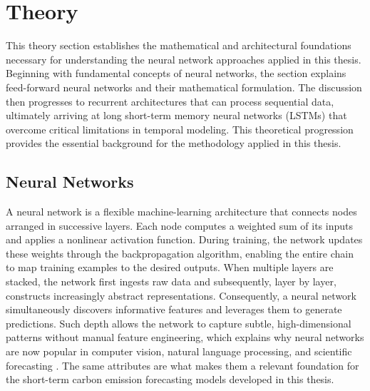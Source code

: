 \thispagestyle{plain}
\section{Theory}
\label{sec:theory}

This theory section establishes the mathematical and architectural foundations necessary for understanding the neural network approaches applied in this thesis. Beginning with fundamental concepts of neural networks, the section explains feed-forward neural networks and their mathematical formulation. The discussion then progresses to recurrent architectures that can process sequential data, ultimately arriving at long short-term memory neural networks (LSTMs) that overcome critical limitations in temporal modeling. This theoretical progression provides the essential background for the methodology applied in this thesis.

\subsection{Neural Networks}

A neural network is a flexible machine-learning architecture that connects nodes arranged in successive layers. Each node computes a weighted sum of its inputs and applies a nonlinear activation function. During training, the network updates these weights through the backpropagation algorithm, enabling the entire chain to map training examples to the desired outputs. When multiple layers are stacked, the network first ingests raw data and subsequently, layer by layer, constructs increasingly abstract representations. Consequently, a neural network simultaneously discovers informative features and leverages them to generate predictions. Such depth allows the network to capture subtle, high-dimensional patterns without manual feature engineering, which explains why neural networks are now popular in computer vision, natural language processing, and scientific forecasting \parencite{goodfellow2016}. The same attributes are what makes them a relevant foundation for the short-term carbon emission forecasting models developed in this thesis.

